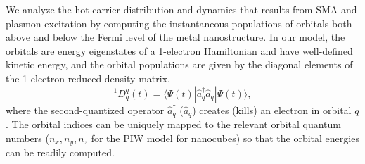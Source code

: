 \documentclass[journal=jpclcd,manuscript=letter]{achemso}
\begin{document}
We analyze the hot-carrier distribution and dynamics that results from SMA and plasmon excitation by computing the 
instantaneous populations of orbitals both above and below the Fermi level of the metal nanostructure.   
In our model, the orbitals are energy eigenstates of a 1-electron Hamiltonian and have well-defined kinetic energy,
and the orbital populations are given by the diagonal elements of the 1-electron reduced density matrix,
\begin{equation}
^1D^q_q(t) = \langle \Psi(t) | \hat{a}^{\dagger}_q \hat{a}_q | \Psi(t) \rangle,
\end{equation} 
where the second-quantized operator $\hat{a}_q^{\dagger}$ ($\hat{a}_q$) creates (kills) an electron
in orbital $q$.  The orbital indices can be uniquely mapped to the relevant orbital quantum numbers ($n_x, n_y, n_z$ for
the PIW model for nanocubes) so that the orbital energies can be readily computed. 
\end{document}
